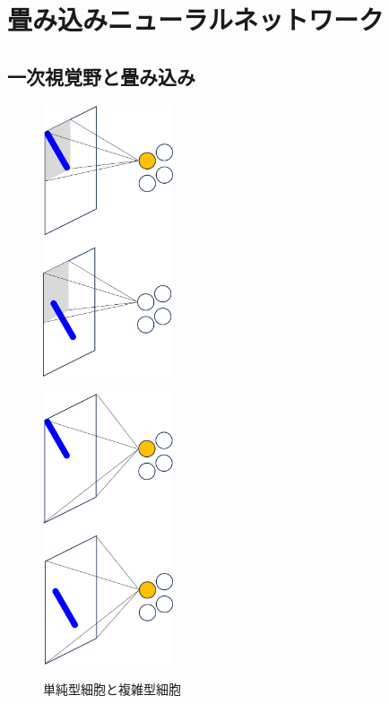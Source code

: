 \documentclass[a4paper,11pt]{jsreport}
\begin{document}
\section{畳み込みニューラルネットワーク}
\subsection{一次視覚野と畳み込み}
\begin{figure}[H]
  \begin{minipage}[b]{0.5\linewidth}
    \centering
    \includegraphics[height=8cm]{image/単純型細胞.png}
    \label{単純型細胞}
  \end{minipage}
  \begin{minipage}[b]{0.5\linewidth}
    \centering
    \includegraphics[height=8cm]{image/複雑型細胞.png}
    \label{複雑型細胞}
  \end{minipage}
  \caption{単純型細胞と複雑型細胞}
  \label{単純型細胞と複雑型細胞}
\end{figure}
\end{document}
